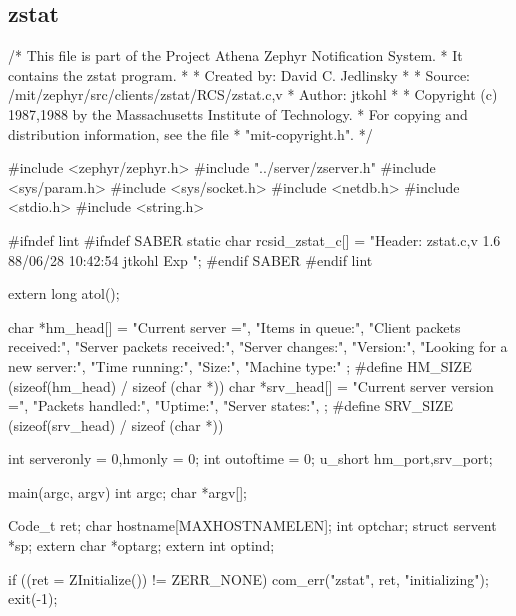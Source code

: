 %
\subsection{zstat}
\label{ex-zstat}

\begin{code}
/* This file is part of the Project Athena Zephyr Notification System.
 * It contains the zstat program.
 *
 *      Created by:     David C. Jedlinsky
 *
 *      Source: /mit/zephyr/src/clients/zstat/RCS/zstat.c,v 
 *      Author: jtkohl 
 *
 *      Copyright (c) 1987,1988 by the Massachusetts Institute of Technology.
 *      For copying and distribution information, see the file
 *      "mit-copyright.h". 
 */

#include <zephyr/zephyr.h>
#include "../server/zserver.h"
#include <sys/param.h>
#include <sys/socket.h>
#include <netdb.h>
#include <stdio.h>
#include <string.h>

#ifndef lint
#ifndef SABER
static char rcsid_zstat_c[] =
 "Header: zstat.c,v 1.6 88/06/28 10:42:54 jtkohl Exp ";
#endif SABER
#endif lint
                     
extern long atol();

char *hm_head[] = { "Current server =",
                     "Items in queue:",
                     "Client packets received:",
                     "Server packets received:",
                     "Server changes:",
                     "Version:",
                     "Looking for a new server:",
                     "Time running:",
                     "Size:",
                     "Machine type:"
};
#define HM_SIZE (sizeof(hm_head) / sizeof (char *))
char *srv_head[] = { 
        "Current server version =",
        "Packets handled:",
        "Uptime:",
        "Server states:",
};
#define SRV_SIZE        (sizeof(srv_head) / sizeof (char *))

int serveronly = 0,hmonly = 0;
int outoftime = 0;
u_short hm_port,srv_port;

main(argc, argv)
        int argc;
        char *argv[];
{
        Code_t ret;
        char hostname[MAXHOSTNAMELEN];
        int optchar;
        struct servent *sp;
        extern char *optarg;
        extern int optind;

        if ((ret = ZInitialize()) != ZERR_NONE) {
                com_err("zstat", ret, "initializing");
                exit(-1);
        }

}
\end{code}
